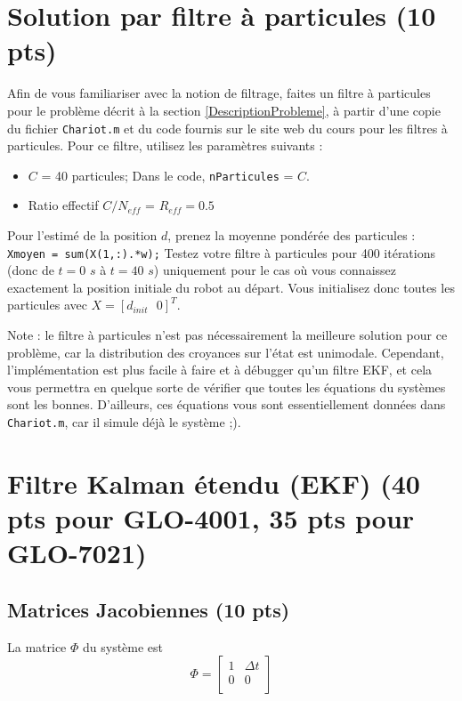 \documentclass[12pt]{article}
\begin{document}
\section {Solution par filtre à particules (10 pts)}
\label{Particules}
Afin de vous familiariser avec la notion de filtrage, faites un filtre à particules pour le problème décrit à la section \ref{DescriptionProbleme}, à partir d'une copie du fichier \texttt{Chariot.m} et du code fournis sur le site web du cours pour les filtres à particules. Pour ce filtre, utilisez les paramètres suivants :
\begin{itemize}
\item $C$ = 40 particules; Dans le code, \texttt{nParticules} = $C$.
\item Ratio effectif $C/N_{eff}$ = $R_{eff} = 0.5$
\end{itemize}

Pour l'estimé de la position $d$, prenez la moyenne pondérée des particules : \texttt{Xmoyen = sum(X(1,:).*w);} Testez votre filtre à particules pour 400 itérations (donc de $t=0$ $s$ à $t=40$ $s$) uniquement pour le cas où vous connaissez exactement la position initiale du robot au départ. Vous initialisez donc toutes les particules avec $X=[d_{init} \mbox{ }0]^T$.

Note : le filtre à particules n'est pas nécessairement la meilleure solution pour ce problème, car la distribution des croyances sur l'état est unimodale. Cependant, l'implémentation est plus facile à faire et à débugger qu'un filtre EKF, et cela vous permettra en quelque sorte de vérifier que toutes les équations du systèmes sont les bonnes. D'ailleurs, ces équations vous sont essentiellement données dans \texttt{Chariot.m}, car il simule déjà le système ;). 


\newpage
\section{Filtre Kalman étendu (EKF) (40 pts pour GLO-4001, 35 pts pour GLO-7021)}
\label{EKF}
\subsection{Matrices Jacobiennes (10 pts)}
La matrice $\Phi$ du système est
\begin{equation}
\Phi = \begin{bmatrix}
1 &  \Delta t  \\
0  &  0     \\
\end{bmatrix}
\end{equation}
\end{document}
